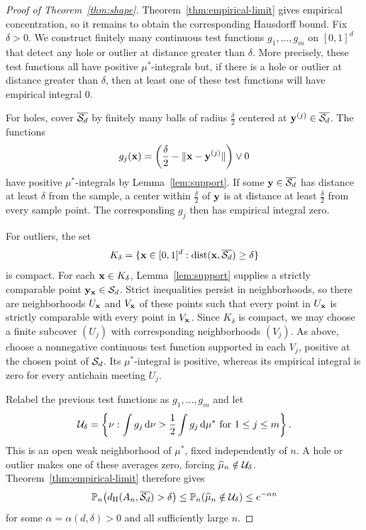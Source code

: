 \documentclass[11pt,letterpaper]{article}
\begin{document}
\begin{proof}[Proof of Theorem~\ref{thm:shape}]
      Theorem~\ref{thm:empirical-limit} gives empirical concentration, so it remains to obtain the corresponding Hausdorff bound. Fix $\delta>0$. We construct finitely many continuous test functions $g_{1},\ldots,g_{m}$ on $[0,1]^{d}$ that detect any hole or outlier at distance greater than $\delta$. More precisely, these test functions all have positive $\mu^\ast$-integrals but, if there is a hole or outlier at distance greater than $\delta$, then at least one of these test functions will have empirical integral $0$.

      For holes, cover $\overline{\mathcal S_d}$ by finitely many balls of radius $\frac\delta2$ centered at $\mathbf y^{(j)}\in\overline{\mathcal S_d}$. The functions
      \[
            g_j(\mathbf x)=\left(\frac\delta2-\|\mathbf x-\mathbf y^{(j)}\|\right) \vee 0
      \]
      have positive $\mu^\ast$-integrals by Lemma~\ref{lem:support}. If some $\mathbf y\in\overline{\mathcal S_d}$ has distance at least $\delta$ from the sample, a center within $\frac\delta2$ of $\mathbf y$ is at distance at least $\frac\delta2$ from every sample point. The corresponding $g_j$ then has empirical integral zero.

      For outliers, the set
      \[
            K_\delta=\{\mathbf x\in[0,1]^d:\operatorname{dist}(\mathbf x,\overline{\mathcal S_d})\ge\delta\}
      \]
      is compact. For each $\mathbf x\in K_\delta$, Lemma~\ref{lem:support} supplies a strictly comparable point $\mathbf y_{\mathbf x}\in\mathcal S_d$. Strict inequalities persist in neighborhoods, so there are neighborhoods $U_{\mathbf x}$ and $V_{\mathbf x}$ of these points such that every point in $U_{\mathbf x}$ is strictly comparable with every point in $V_{\mathbf x}$. Since $K_\delta$ is compact, we may choose a finite subcover $(U_j)$ with corresponding neighborhoods $(V_j)$. As above, choose a nonnegative continuous test function supported in each $V_j$, positive at the chosen point of $\mathcal S_d$. Its $\mu^\ast$-integral is positive, whereas its empirical integral is zero for every antichain meeting $U_j$.

      Relabel the previous test functions as $g_1,\ldots,g_m$ and let
      \[
            \mathcal U_\delta=\left\{\nu: \int g_j\,\mathrm d\nu>\frac12\int g_j\,\mathrm d\mu^\ast \text{ for }1\le j\le m\right\}.
      \]
      This is an open weak neighborhood of $\mu^\ast$, fixed independently of $n$. A hole or outlier makes one of these averages zero, forcing $\widehat\mu_n\notin\mathcal U_\delta$. Theorem~\ref{thm:empirical-limit} therefore gives
      \[
            \mathbb P_n\bigl(d_{\rm H}(A_n,\overline{\mathcal S_d})>\delta\bigr) \le\mathbb P_n(\widehat\mu_n\notin\mathcal U_\delta) \le e^{-\alpha n}
      \]
      for some $\alpha=\alpha(d,\delta)>0$ and all sufficiently large $n$.
\end{proof}
\end{document}
